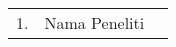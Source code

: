 \begin{center}
\begin{longtable}{| m{1cm} | m{3cm}| p{8cm} |}
		\multirow[t]{6}{*}{1.}             & Nama Peneliti                          & \cite{pipin2023prediksi}                                                                                                                                                                                                                                                                                                                                                                                                                                                                                                                                                                                                                                                                                                                                                                                                                                                                                                                                                                                                                                                                                                                                                                                                                                                                                                                                                                                                                                                                                                                                                                                                                                                                                                                                                                                                                                                                                                                                                                                                                                                                                                                                                                                                                                                                                                                                                                                                                                                                                                                                                                                                                                           \\         

\end{longtable}
\end{center}
